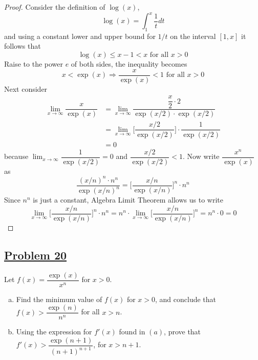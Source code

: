 \documentclass[10pt,letterpaper]{article}
\begin{document}
\begin{proof}
Consider the definition of $\log(x)$, 
	$$\log(x) = \int_1^x\dfrac{1}{t}dt$$ and using a constant lower and upper bound for $1/t$ on the interval $[1, x]$ it follows that 
		$$\log(x) \leq x - 1 < x \text{ for all } x > 0$$  
		Raise to the power $e$ of both sides, the inequality becomes 
		$$x < \exp(x) \Rightarrow \dfrac{x}{\exp(x)} < 1 \text{ for all } x > 0$$
		Next consider
\begin{align*}
	\lim_{x\to \infty} \dfrac{x}{\exp(x)} 
	&= \lim_{x\to \infty} \dfrac{\dfrac{x}{2} \cdot 2}{\exp(x/2) \cdot \exp(x/2)} \\
	&= \lim_{x\to \infty} \bigg[ \dfrac{x/2}{\exp(x/2)} \bigg] \cdot \dfrac{1}{\exp(x/2)} \\
	&= 0 
\end{align*}	
	because $\displaystyle\lim_{x\to \infty} \dfrac{1}{\exp(x/2)} = 0$ and $\dfrac{x/2}{\exp(x/2)} < 1$.
	Now write $\dfrac{x^n}{\exp(x)}$ as
	$$\dfrac{(x/n)^n \cdot n^n}{\exp(x/n)^n}
	= \bigg[\dfrac{x/n}{\exp(x/n)}\bigg]^n \cdot n^n$$
	Since $n^n$ is just a constant, Algebra Limit Theorem allows us to write
$$\displaystyle\lim_{x\to \infty} \bigg[\dfrac{x/n}{\exp(x/n)}\bigg]^n \cdot n^n
= n^n \cdot \displaystyle\lim_{x\to \infty} \bigg[\dfrac{x/n}{\exp(x/n)}\bigg]^n
= n^n \cdot 0 = 0$$
	
	
	
	
\end{proof}
	
	
	\subsection*{{\color{purple}\underline{Problem 20}}}
	Let $f(x) = \dfrac{\exp(x)}{x^n}$ for $x > 0$.
	\begin{enumerate}[(a)]
\item Find the minimum value of $f(x)$ for $x > 0$, and conclude that 
$f(x) > \dfrac{\exp(n)}{n^n}$ for all $x > n$.
\item Using the expression for $f'(x)$ found in $(a)$, prove that 
$f'(x) > \dfrac{\exp(n + 1)}{(n + 1)^{n+1}}$, for $x > n + 1$.
	\end{enumerate}
	
	
\end{document}
